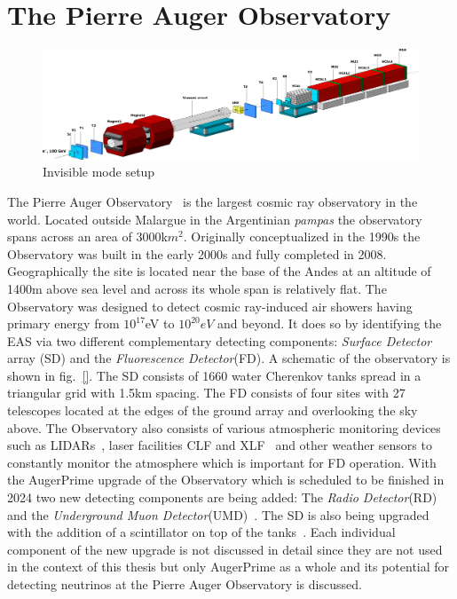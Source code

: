 
\chapter{The Pierre Auger Observatory}
\label{chap:setup}
\begin{figure}[h!]
\centering
\includegraphics[width=\textwidth]{thesis_figures/Invisible_3d_setup.png}
\caption{Invisible mode setup~\cite{Banerjee:2016tad}}
\label{fig:Invisible_mode_setup}
\end{figure}

The Pierre Auger Observatory~\cite{} is the largest cosmic ray observatory in the world. Located outside Malargue in the Argentinian \textit{pampas} the observatory spans across an area of 3000k$m^2$. Originally conceptualized in the 1990s the Observatory was built in the early 2000s and fully completed in 2008. Geographically the site is located near the base of the Andes at an altitude of 1400m above sea level and across its whole span is relatively flat. The Observatory was designed to detect cosmic ray-induced air showers having primary energy from $10^{17}$eV to $10^{20}eV$ and beyond. It does so by identifying the EAS via two different complementary detecting components: \textit{Surface Detector} array (SD) and the \textit{Fluorescence Detector}(FD). A schematic of the observatory is shown in fig.~\ref{}. The SD consists of 1660 water Cherenkov tanks spread in a triangular grid with 1.5km spacing. The FD consists of four sites with 27 telescopes located at the edges of the ground array and overlooking the sky above. The Observatory also consists of various atmospheric monitoring devices such as LIDARs~\cite{}, laser facilities CLF and XLF~\cite{} and other weather sensors to constantly monitor the atmosphere which is important for FD operation. With the AugerPrime upgrade of the Observatory which is scheduled to be finished in 2024 two new detecting components are being added: The \textit{Radio Detector}(RD)~\cite{} and the \textit{Underground Muon Detector}(UMD)~\cite{}. The SD is also being upgraded with the addition of a scintillator on top of the tanks~\cite{}. Each individual component of the new upgrade is not discussed in detail since they are not used in the context of this thesis but only AugerPrime as a whole and its potential for detecting neutrinos at the Pierre Auger Observatory is discussed.

